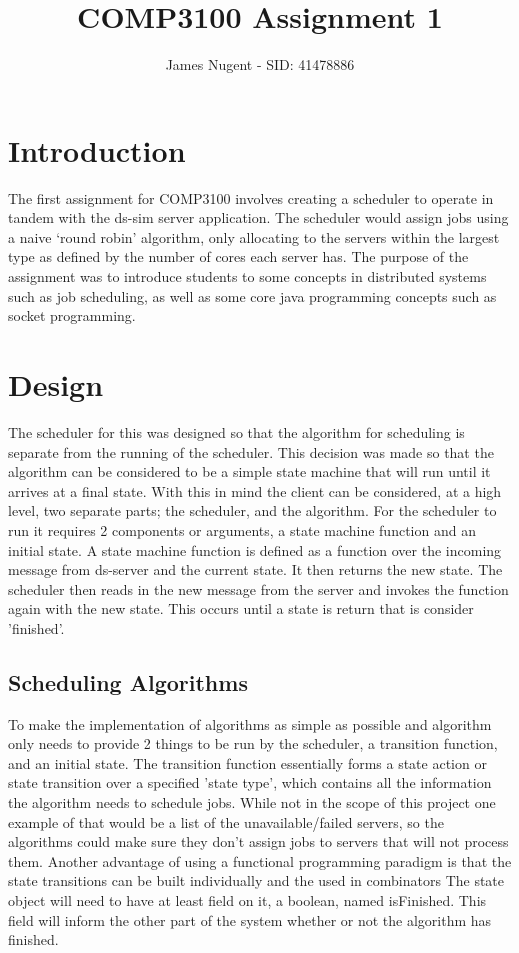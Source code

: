 \documentclass[12pt, letterpaper]{article}
\title{COMP3100 Assignment 1}
\author{James Nugent - SID: 41478886}
\begin{document}
\maketitle
\section*{Introduction}
The first assignment for COMP3100 involves creating a scheduler to operate in tandem with the ds-sim server application.
The scheduler would assign jobs using a naive `round robin' algorithm, only allocating to the servers within the largest type as defined by the number of cores each server has.
The purpose of the assignment was to introduce students to some concepts in distributed systems such as job scheduling, as well as some core java programming concepts such as socket programming.

\section*{Design}
The scheduler for this was designed so that the algorithm for scheduling is separate from the running of the scheduler.
This decision was made so that the algorithm can be considered to be a simple state machine that will run until it arrives at a final state. 
With this in mind the client can be considered, at a high level, two separate parts; the scheduler, and the algorithm.
\newline
For the scheduler to run it requires 2 components or arguments, a state machine function and an initial state. 
A state machine function is defined as a function over the incoming message from ds-server and the current state.
It then returns the new state. The scheduler then reads in the new message from the server and invokes the function again with the new state.
This occurs until a state is return that is consider 'finished'. 
\subsection*{Scheduling Algorithms}
To make the implementation of algorithms as simple as possible and algorithm only needs to provide 2 things to be run by the scheduler, a transition function, and an initial state.
The transition function essentially forms a state action or state transition \cite{scala_fp} over a specified 'state type', which contains all the information the algorithm needs to schedule jobs.
While not in the scope of this project one example of that would be a list of the unavailable/failed servers, so the algorithms could make sure they don't assign jobs to servers that will not process them.
Another advantage of using a functional programming paradigm is that the state transitions can be built individually and the used in combinators \cite{scala_fp}
The state object will need to have at least field on it, a boolean, named isFinished. This field will inform the other part of the system whether or not the algorithm has finished.
\end{document}
